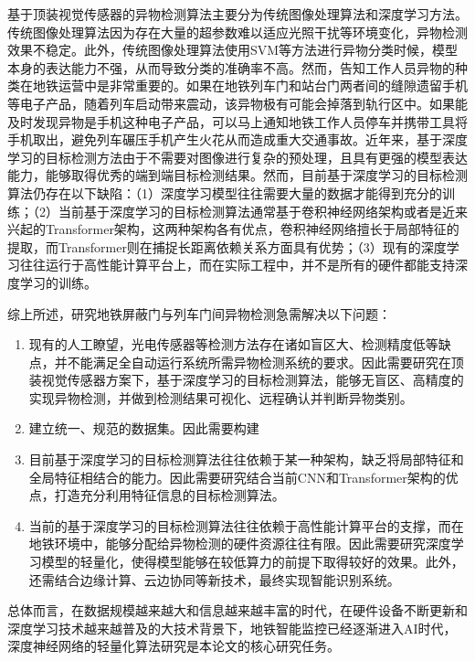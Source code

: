 基于顶装视觉传感器的异物检测算法主要分为传统图像处理算法和深度学习方法。传统图像处理算法因为存在大量的超参数难以适应光照干扰等环境变化，异物检测效果不稳定。此外，传统图像处理算法使用SVM等方法进行异物分类时候，模型本身的表达能力不强，从而导致分类的准确率不高。然而，告知工作人员异物的种类在地铁运营中是非常重要的。如果在地铁列车门和站台门两者间的缝隙遗留手机等电子产品，随着列车启动带来震动，该异物极有可能会掉落到轨行区中。如果能及时发现异物是手机这种电子产品，可以马上通知地铁工作人员停车并携带工具将手机取出，避免列车碾压手机产生火花从而造成重大交通事故。近年来，基于深度学习的目标检测方法由于不需要对图像进行复杂的预处理，且具有更强的模型表达能力，能够取得优秀的端到端目标检测结果。然而，目前基于深度学习的目标检测算法仍存在以下缺陷：（1）深度学习模型往往需要大量的数据才能得到充分的训练；（2）当前基于深度学习的目标检测算法通常基于卷积神经网络架构或者是近来兴起的Transformer架构，这两种架构各有优点，卷积神经网络擅长于局部特征的提取，而Transformer则在捕捉长距离依赖关系方面具有优势；（3）现有的深度学习往往运行于高性能计算平台上，而在实际工程中，并不是所有的硬件都能支持深度学习的训练。

综上所述，研究地铁屏蔽门与列车门间异物检测急需解决以下问题：
\begin{enumerate}[topsep = 0 pt, itemsep= 0 pt, parsep=0pt, partopsep=0pt, leftmargin=44pt, itemindent=0pt, labelsep=6pt, label=(\arabic*)]
	\item 现有的人工瞭望，光电传感器等检测方法存在诸如盲区大、检测精度低等缺点，并不能满足全自动运行系统所需异物检测系统的要求。因此需要研究在顶装视觉传感器方案下，基于深度学习的目标检测算法，能够无盲区、高精度的实现异物检测，并做到检测结果可视化、远程确认并判断异物类别。
	
	\item 建立统一、规范的数据集。因此需要构建
	
	\item 目前基于深度学习的目标检测算法往往依赖于某一种架构，缺乏将局部特征和全局特征相结合的能力。因此需要研究结合当前CNN和Transformer架构的优点，打造充分利用特征信息的目标检测算法。 
	
	\item 当前的基于深度学习的目标检测算法往往依赖于高性能计算平台的支撑，而在地铁环境中，能够分配给异物检测的硬件资源往往有限。因此需要研究深度学习模型的轻量化，使得模型能够在较低算力的前提下取得较好的效果。此外，还需结合边缘计算、云边协同等新技术，最终实现智能识别系统。  
\end{enumerate}

总体而言，在数据规模越来越大和信息越来越丰富的时代，在硬件设备不断更新和深度学习技术越来越普及的大技术背景下，地铁智能监控已经逐渐进入AI时代，深度神经网络的轻量化算法研究是本论文的核心研究任务。
